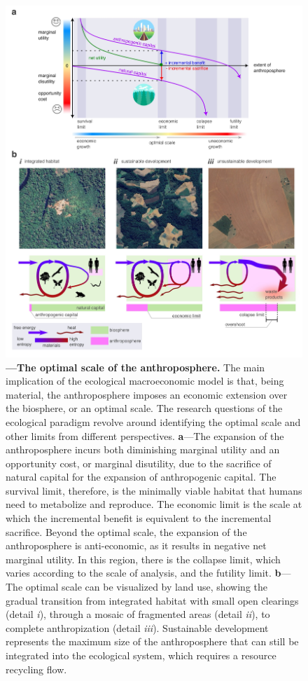 \documentclass[./main_en.tex]{subfiles}
\begin{document}
\begin{figure}[t!] 
\centering				
\includegraphics[width=0.98\linewidth]{figs/fig_optscale_en.jpg}		
\caption[The Optimal Scale of the Anthroposphere]
{\textbf{---\;The optimal scale of the anthroposphere.}
    The main implication of the ecological macroeconomic model is that, being material, the anthroposphere imposes an economic extension over the biosphere, or an optimal scale. The research questions of the ecological paradigm revolve around identifying the optimal scale and other limits from different perspectives.
    \;\textbf{a}\;---\;The expansion of the anthroposphere incurs both diminishing marginal utility and an opportunity cost, or marginal disutility, due to the sacrifice of natural capital for the expansion of anthropogenic capital. The survival limit, therefore, is the minimally viable habitat that humans need to metabolize and reproduce. The economic limit is the scale at which the incremental benefit is equivalent to the incremental sacrifice. Beyond the optimal scale, the expansion of the anthroposphere is anti-economic, as it results in negative net marginal utility. In this region, there is the collapse limit, which varies according to the scale of analysis, and the futility limit.
    \;\textbf{b}\;---\;The optimal scale can be visualized by land use, showing the gradual transition from integrated habitat with small open clearings (detail \textrm{\textit{i}}), through a mosaic of fragmented areas (detail \textrm{\textit{ii}}), to complete anthropization (detail \textrm{\textit{iii}}). Sustainable development represents the maximum size of the anthroposphere that can still be integrated into the ecological system, which requires a resource recycling flow.
}
\label{fig:eco:escaleopt} 		
\end{figure}
\end{document}
